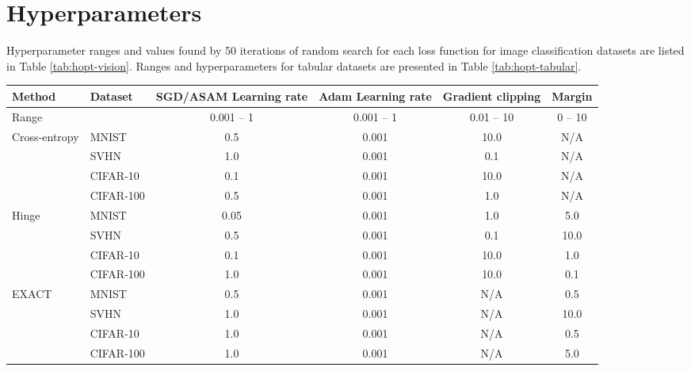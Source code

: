 \documentclass[nohyperref]{article}
\theoremstyle{plain}
\theoremstyle{definition}
\theoremstyle{remark}
\begin{document}
\section{Hyperparameters}

Hyperparameter ranges and values found by 50 iterations of random search for each loss function for image classification datasets are listed in Table \ref{tab:hopt-vision}. Ranges and hyperparameters for tabular datasets are presented in Table \ref{tab:hopt-tabular}.
\begin{table*}[t]
\centering
\begin{tabular}{l|l|cccc}
Method & Dataset & SGD/ASAM Learning rate & Adam Learning rate & Gradient clipping & Margin \\
\hline
Range & & 0.001 -- 1 & 0.001 -- 1 & 0.01 -- 10 & 0 -- 10 \\
\hline
\multirow{3}{*}{Cross-entropy}
& MNIST & 0.5 & 0.001 & 10.0 & N/A \\
& SVHN & 1.0 & 0.001 & 0.1 & N/A \\
& CIFAR-10 & 0.1 & 0.001 & 10.0 & N/A \\
& CIFAR-100 & 0.5 & 0.001 & 1.0 & N/A \\
\hline
\multirow{3}{*}{Hinge}
& MNIST & 0.05 & 0.001 & 1.0 & 5.0 \\
& SVHN & 0.5 & 0.001 & 0.1 & 10.0 \\
& CIFAR-10 & 0.1 & 0.001 & 10.0 & 1.0 \\
& CIFAR-100 & 1.0 & 0.001 & 10.0 & 0.1 \\
\hline
\multirow{3}{*}{EXACT}
& MNIST & 0.5 & 0.001 & N/A & 0.5 \\
& SVHN & 1.0 & 0.001 & N/A & 10.0 \\
& CIFAR-10 & 1.0 & 0.001 & N/A & 0.5 \\
& CIFAR-100 & 1.0 & 0.001 & N/A & 5.0 \\
\end{tabular}

\caption{Hyperparameters for vision classification datasets.}
\label{tab:hopt-vision}
\end{table*}
\end{document}
